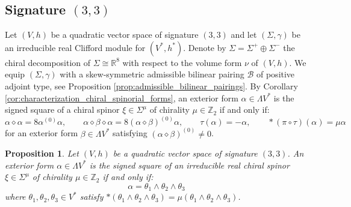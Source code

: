 \documentclass[10pt,reqno]{amsart}
\newtheorem{proposition}[theorem]{Proposition}
\theoremstyle{definition}
\theoremstyle{remark}
\newcommand{\Z}{\mathbb{Z}}
\newcommand{\R}{\mathbb{R}}
\begin{document}
\subsection{Signature \texorpdfstring{$(3,3)$}{(3,3)}}

Let $(V,h)$ be a quadratic vector space of signature $(3,3)$ and let $(\Sigma,\gamma)$ be an irreducible real Clifford module for $(V^*,h^*)$. Denote by $\Sigma=\Sigma^+\oplus\Sigma^-$ the chiral decomposition of $\Sigma\cong\R^8$ with respect to the volume form $\nu$ of $(V,h)$. We equip $(\Sigma,\gamma)$ with a skew-symmetric admissible bilinear pairing $\mathscr{B}$ of positive adjoint type, see Proposition \ref{prop:admissible_bilinear_pairings}. By Corollary \ref{cor:characterization_chiral_spinorial_forms}, an exterior form $\alpha\in\Lambda V^*$ is the signed square of a chiral spinor $\xi\in\Sigma^\mu$ of chirality $\mu\in\Z_2$ if and only if: $$\alpha\diamond\alpha=8\alpha^{(0)}\alpha,\qquad \alpha\diamond\beta\diamond\alpha=8(\alpha\diamond\beta)^{(0)}\alpha,\qquad\tau(\alpha)=-\alpha,\qquad*(\pi\circ\tau)(\alpha)=\mu\alpha$$ for an exterior form $\beta\in\Lambda V^*$ satisfying $(\alpha\diamond\beta)^{(0)}\neq0$.

\begin{proposition}\label{prop:square_(3,3)}
    Let $(V,h)$ be a quadratic vector space of signature $(3,3)$. An exterior form $\alpha\in\Lambda V^*$ is the signed square of an irreducible real chiral spinor $\xi\in\Sigma^\mu$ of chirality $\mu\in\Z_2$ if and only if: $$\alpha=\theta_1\wedge\theta_2\wedge\theta_3$$ where $\theta_1,\theta_2,\theta_3\in V^*$ satisfy $*(\theta_1\wedge\theta_2\wedge\theta_3)=\mu(\theta_1\wedge\theta_2\wedge\theta_3)$.
\end{proposition}
\end{document}
